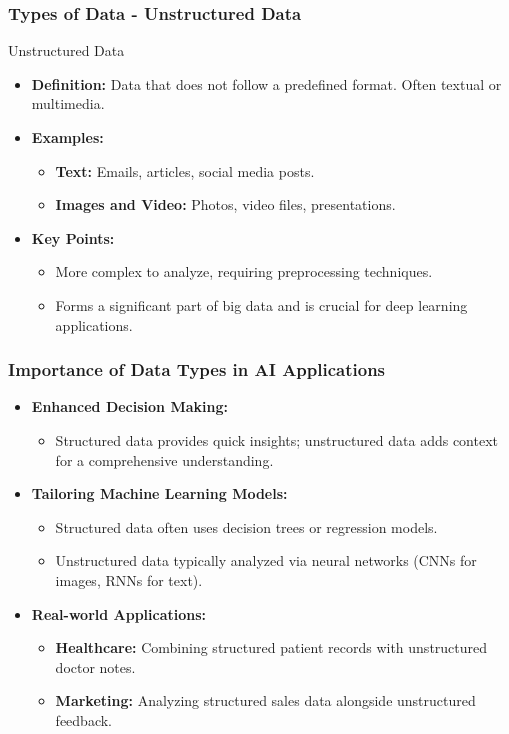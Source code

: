 \documentclass[aspectratio=169]{beamer}
\begin{document}
\begin{frame}[fragile]
    \frametitle{Types of Data - Unstructured Data}
    \begin{block}{Unstructured Data}
        \begin{itemize}
            \item \textbf{Definition:} Data that does not follow a predefined format. Often textual or multimedia.
            \item \textbf{Examples:}
            \begin{itemize}
                \item \textbf{Text:} Emails, articles, social media posts.
                \item \textbf{Images and Video:} Photos, video files, presentations.
            \end{itemize}
            \item \textbf{Key Points:}
            \begin{itemize}
                \item More complex to analyze, requiring preprocessing techniques.
                \item Forms a significant part of big data and is crucial for deep learning applications.
            \end{itemize}
        \end{itemize}
    \end{block}
\end{frame}

\begin{frame}[fragile]
    \frametitle{Importance of Data Types in AI Applications}
    \begin{itemize}
        \item \textbf{Enhanced Decision Making:}
        \begin{itemize}
            \item Structured data provides quick insights; unstructured data adds context for a comprehensive understanding.
        \end{itemize}
        
        \item \textbf{Tailoring Machine Learning Models:}
        \begin{itemize}
            \item Structured data often uses decision trees or regression models.
            \item Unstructured data typically analyzed via neural networks (CNNs for images, RNNs for text).
        \end{itemize}
        
        \item \textbf{Real-world Applications:}
        \begin{itemize}
            \item \textbf{Healthcare:} Combining structured patient records with unstructured doctor notes.
            \item \textbf{Marketing:} Analyzing structured sales data alongside unstructured feedback.
        \end{itemize}
    \end{itemize}
\end{frame}
\end{document}
